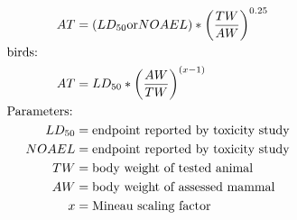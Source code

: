 \documentclass[10pt]{article}
\begin{document}
\begin{align*}
AT & = (LD_{50} \text{or} NOAEL)*\left(\frac{TW}{AW}\right)^{0.25}\\
&    \hspace{-.75in}  \text{birds:}\nonumber \\
AT & = LD_{50}*\left(\frac{AW}{TW}\right)^{(x-1)}\\
&    \hspace{-.75in}  \text{Parameters:}\nonumber \\
LD_{50} & = \text{endpoint reported by toxicity study}\\
NOAEL & = \text{endpoint reported by toxicity study}\\
TW & = \text{body weight of tested animal}\\
AW & = \text{body weight of assessed mammal}\\
x & = \text{Mineau scaling factor}\\
\end{align*} 
\end{document}
